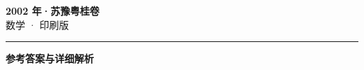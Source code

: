 \documentclass[zihao=5, a4paper]{ctexart}
\begin{document}
\begin{center}
  {\Large\bfseries 2002 年·苏豫粤桂卷}\\[4pt]
  {\large 数学 · 印刷版}
\end{center}
\medskip
{}

\par\bigskip\hrule\bigskip
{}
\begin{center}{\large\bfseries 参考答案与详细解析}\end{center}
\smallskip

\end{document}
